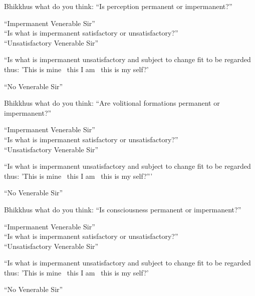 \begin{english-only-nohang}
  \begin{english-only-hang}
    Bhikkhus what do you think: ``Is perception permanent or impermanent?''
  \end{english-only-hang}
  ``Impermanent Venerable Sir''\\
  ``Is what is impermanent satisfactory or unsatisfactory?''\\
  ``Unsatisfactory Venerable Sir''\\
  \begin{english-hangtogether}
    ``Is what is impermanent unsatisfactory and subject to change fit to be regarded thus: 'This is mine \breathmark\ this I am \breathmark\ this is my self?'
  \end{english-hangtogether}
  ``No Venerable Sir''
\end{english-only-nohang}

\begin{english-only-nohang}
  \begin{english-only-hang}
    Bhikkhus what do you think: ``Are volitional formations permanent or impermanent?''
  \end{english-only-hang}
  ``Impermanent Venerable Sir''\\
  ``Is what is impermanent satisfactory or unsatisfactory?''\\
  ``Unsatisfactory Venerable Sir''
  \begin{english-hangtogether}
    ``Is what is impermanent unsatisfactory and subject to change fit to be regarded thus: 'This is mine \breathmark\ this I am \breathmark\ this is my self?'''
  \end{english-hangtogether}
  ``No Venerable Sir''
\end{english-only-nohang}

\begin{english-only-nohang}
  \begin{english-only-hang}
    Bhikkhus what do you think: ``Is consciousness permanent or impermanent?''
  \end{english-only-hang}
  ``Impermanent Venerable Sir''\\
  ``Is what is impermanent satisfactory or unsatisfactory?''\\
  ``Unsatisfactory Venerable Sir''\\
  \begin{english-hangtogether}
    ``Is what is impermanent unsatisfactory and subject to change fit to be regarded thus: 'This is mine \breathmark\ this I am \breathmark\ this is my self?'
  \end{english-hangtogether}
  ``No Venerable Sir''
\end{english-only-nohang}

